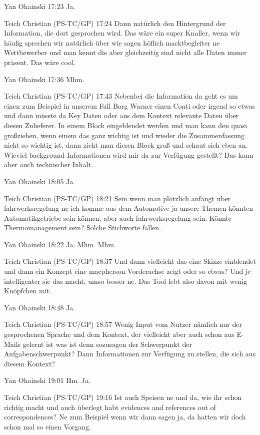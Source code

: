 Yan Ohainski   17:23
Ja.

Teich Christian (PS-TC/GP)   17:24
Dann natürlich den Hintergrund der Information, die dort gesprochen wird. Das wäre ein super Knaller, wenn wir häufig sprechen wir natürlich über wie sagen höflich marktbegleiter ne Wettbewerber und man kennt die aber gleichzeitig sind nicht alle Daten immer präsent. Das wäre cool.

Yan Ohainski   17:36
Mhm.

Teich Christian (PS-TC/GP)   17:43
Nebenbei die Information da geht es um einen zum Beispiel in unserem Fall Borg Warner einen Conti oder irgend so etwas und dann müsste da Key Daten oder aus dem Kontext relevante Daten über diesen Zulieferer.
In einem Block eingeblendet werden und man kann den quasi großziehen, wenn einem das ganz wichtig ist und wieder die Zusammenfassung nicht so wichtig ist, dann zieht man diesen Block groß und schaut sich eben an. Wieviel background Informationen wird mir da zur Verfügung gestellt? Das kann aber auch technischer Inhalt.

Yan Ohainski   18:05
Ja.

Teich Christian (PS-TC/GP)   18:21
Sein wenn man plötzlich anfängt über fahrwerksregelung ne ich komme aus dem Automotive ja unsere Themen könnten Automatikgetriebe sein können, aber auch fahrwerksregelung sein. Könnte Thermomanagement sein? Solche Stichworte fallen.

Yan Ohainski   18:22
Ja.
Mhm.
Mhm.

Teich Christian (PS-TC/GP)   18:37
Und dann vielleicht das eine Skizze einblendet und dann ein Konzept eine macpherson Vorderachse zeigt oder so etwas? Und je intelligenter sie das macht, umso besser ne. Das Tool lebt also davon mit wenig Knöpfchen mit.

Yan Ohainski   18:48
Ja.

Teich Christian (PS-TC/GP)   18:57
Wenig Input vom Nutzer nämlich nur der gesprochenen Sprache und dem Kontext, der vielleicht aber auch schon aus E-Mails gelernt ist was ist denn sozusagen der Schwerpunkt der Aufgabenschwerpunkt? Dann Informationen zur Verfügung zu stellen, die sich aus diesem Kontext?

Yan Ohainski   19:01
Hm.
Ja.

Teich Christian (PS-TC/GP)   19:16
Ist auch Speisen ne und da, wie ihr schon richtig macht und auch überlegt habt evidences and references out of correspondences? Ne zum Beispiel wenn wir dann sagen ja, da hatten wir doch schon mal so einen Vorgang.

